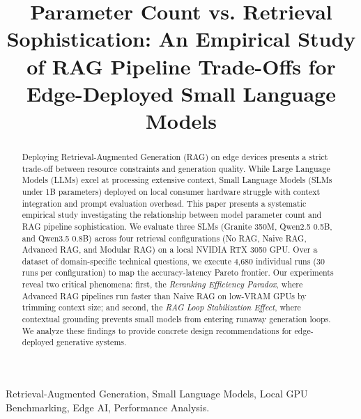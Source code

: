 \documentclass[conference]{IEEEtran}
\begin{document}
\title{Parameter Count vs. Retrieval Sophistication: An Empirical Study of RAG Pipeline Trade-Offs for Edge-Deployed Small Language Models}
\author{
\and
{}
\and
{}
\and
{}
}
\maketitle
\begin{abstract}
Deploying Retrieval-Augmented Generation (RAG) on edge devices presents a strict trade-off between resource constraints and generation quality. While Large Language Models (LLMs) excel at processing extensive context, Small Language Models (SLMs under 1B parameters) deployed on local consumer hardware struggle with context integration and prompt evaluation overhead. This paper presents a systematic empirical study investigating the relationship between model parameter count and RAG pipeline sophistication. We evaluate three SLMs (Granite 350M, Qwen2.5 0.5B, and Qwen3.5 0.8B) across four retrieval configurations (No RAG, Naive RAG, Advanced RAG, and Modular RAG) on a local NVIDIA RTX 3050 GPU. Over a dataset of domain-specific technical questions, we execute 4,680 individual runs (30 runs per configuration) to map the accuracy-latency Pareto frontier. Our experiments reveal two critical phenomena: first, the \textit{Reranking Efficiency Paradox}, where Advanced RAG pipelines run faster than Naive RAG on low-VRAM GPUs by trimming context size; and second, the \textit{RAG Loop Stabilization Effect}, where contextual grounding prevents small models from entering runaway generation loops. We analyze these findings to provide concrete design recommendations for edge-deployed generative systems.
\end{abstract}
\begin{IEEEkeywords}
Retrieval-Augmented Generation, Small Language Models, Local GPU Benchmarking, Edge AI, Performance Analysis.
\end{IEEEkeywords}
\end{document}
